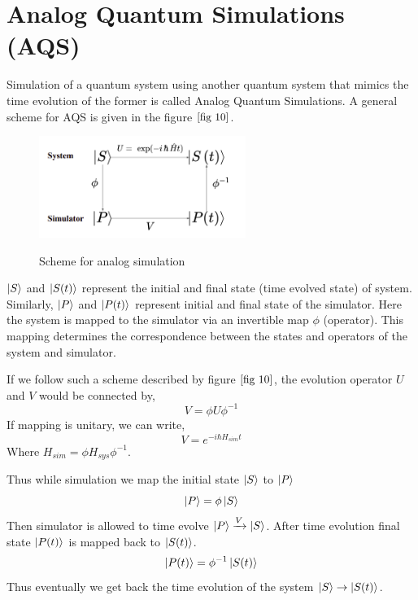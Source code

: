 \documentclass[12pt,a4paper]{report}
\begin{document}
\section{Analog Quantum Simulations (AQS)}
Simulation of a quantum system using another quantum system that mimics the time evolution of the former is called Analog Quantum Simulations. A general scheme for AQS is given in the figure $\ref{fig 10}$.\par
\begin{figure}[h]
\graphicspath{ {./Images/} }	
{\includegraphics[width=0.6\textwidth]{fig_10.png}}
\centering
\caption{Scheme for analog simulation} 
\label{fig 10}
\end{figure}
$\ket{S}$ and $\ket{S(t)}$ represent the initial and final state (time evolved state) of system. Similarly, $\ket{P}$ and $\ket{P(t)}$ represent initial and final state of the simulator. Here the system is mapped to the simulator via an invertible map $\phi$ (operator). This mapping determines the correspondence between the states and operators of the system and simulator.\par
If we follow such a scheme described by figure $\ref*{fig 10}$, the evolution operator $U$ and $ V$ would be connected by,
\begin{equation}
V = \phi U \phi^{-1}
\end{equation}
If mapping is unitary, we can write,
\begin{equation}
V = e^{- i \hbar H_{sim} t}
\end{equation}
Where $H_{sim} = \phi H_{sys} \phi^{-1}$.\par
Thus while simulation we map the initial state $\ket{S}$ to $\ket{P}$
\begin{equation}
\ket{P} = \phi \ket{S} 
\end{equation}
Then simulator is allowed to time evolve $\ket{P} \xrightarrow{V} \ket{S}$. After time evolution final state $\ket{P(t)}$ is mapped back to $\ket{S(t)}$.
\begin{equation}
\ket{P(t)} = \phi^{-1}\ket{S(t)}
\end{equation}
Thus eventually we get back the time evolution of the system $\ket{S} \rightarrow \ket{S(t)}$.
\end{document}
